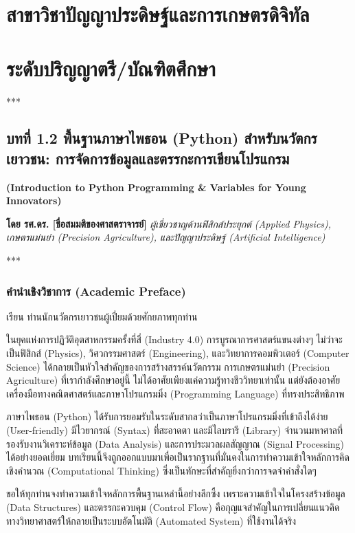 \documentclass[11pt,a4paper,openany]{report}
\begin{document}
\chapter{สาขาวิชาปัญญาประดิษฐ์และการเกษตรดิจิทัล}

\chapter{ระดับปริญญาตรี/บัณฑิตศึกษา}


***

\section{บทที่ 1.2 พื้นฐานภาษาไพธอน (Python) สำหรับนวัตกรเยาวชน: การจัดการข้อมูลและตรรกะการเขียนโปรแกรม}

\textbf{(Introduction to Python Programming \& Variables for Young Innovators)}

\textbf{โดย รศ.ดร. [ชื่อสมมติของศาสตราจารย์]}
\textit{ผู้เชี่ยวชาญด้านฟิสิกส์ประยุกต์ (Applied Physics), เกษตรแม่นยำ (Precision Agriculture), และปัญญาประดิษฐ์ (Artificial Intelligence)}

***

\subsection{คำนำเชิงวิชาการ (Academic Preface)}


เรียน ท่านนักนวัตกรเยาวชนผู้เปี่ยมด้วยศักยภาพทุกท่าน

ในยุคแห่งการปฏิวัติอุตสาหกรรมครั้งที่สี่ (Industry 4.0) การบูรณาการศาสตร์แขนงต่างๆ ไม่ว่าจะเป็นฟิสิกส์ (Physics), วิศวกรรมศาสตร์ (Engineering), และวิทยาการคอมพิวเตอร์ (Computer Science) ได้กลายเป็นหัวใจสำคัญของการสร้างสรรค์นวัตกรรม การเกษตรแม่นยำ (Precision Agriculture) ที่เรากำลังศึกษาอยู่นี้ ไม่ได้อาศัยเพียงแค่ความรู้ทางชีววิทยาเท่านั้น แต่ยังต้องอาศัยเครื่องมือทางคณิตศาสตร์และภาษาโปรแกรมมิ่ง (Programming Language) ที่ทรงประสิทธิภาพ

ภาษาไพธอน (Python) ได้รับการยอมรับในระดับสากลว่าเป็นภาษาโปรแกรมมิ่งที่เข้าถึงได้ง่าย (User-friendly) มีไวยากรณ์ (Syntax) ที่สะอาดตา และมีไลบรารี (Library) จำนวนมหาศาลที่รองรับงานวิเคราะห์ข้อมูล (Data Analysis) และการประมวลผลสัญญาณ (Signal Processing) ได้อย่างยอดเยี่ยม บทเรียนนี้จึงถูกออกแบบมาเพื่อเป็นรากฐานที่มั่นคงในการทำความเข้าใจหลักการคิดเชิงคำนวณ (Computational Thinking) ซึ่งเป็นทักษะที่สำคัญยิ่งกว่าการจดจำคำสั่งใดๆ

ขอให้ทุกท่านจงทำความเข้าใจหลักการพื้นฐานเหล่านี้อย่างลึกซึ้ง เพราะความเข้าใจในโครงสร้างข้อมูล (Data Structures) และตรรกะควบคุม (Control Flow) คือกุญแจสำคัญในการเปลี่ยนแนวคิดทางวิทยาศาสตร์ให้กลายเป็นระบบอัตโนมัติ (Automated System) ที่ใช้งานได้จริง
\end{document}
